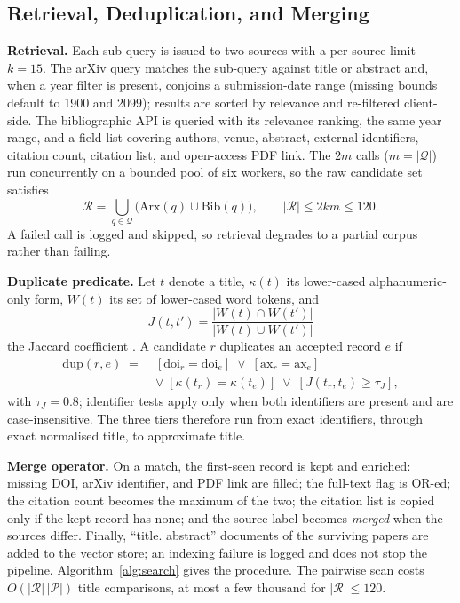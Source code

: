 \documentclass[conference]{IEEEtran}
\newcommand{\cP}{\mathcal{P}}
\newcommand{\cQ}{\mathcal{Q}}
\begin{document}
\subsection{Retrieval, Deduplication, and Merging}
\textbf{Retrieval.} Each sub-query is issued to two sources with a per-source limit $k=15$. The arXiv query matches the sub-query against title or abstract and, when a year filter is present, conjoins a submission-date range (missing bounds default to 1900 and 2099); results are sorted by relevance and re-filtered client-side. The bibliographic API is queried with its relevance ranking, the same year range, and a field list covering authors, venue, abstract, external identifiers, citation count, citation list, and open-access PDF link. The $2m$ calls ($m=|\cQ|$) run concurrently on a bounded pool of six workers, so the raw candidate set satisfies
\begin{equation}
\mathcal{R}=\bigcup_{q\in\cQ}\big(\mathrm{Arx}(q)\cup\mathrm{Bib}(q)\big),\qquad |\mathcal{R}|\le 2km\le 120 .
\label{eq:raw}
\end{equation}
A failed call is logged and skipped, so retrieval degrades to a partial corpus rather than failing.

\textbf{Duplicate predicate.} Let $t$ denote a title, $\kappa(t)$ its lower-cased alphanumeric-only form, $W(t)$ its set of lower-cased word tokens, and
\begin{equation}
J(t,t')=\frac{|W(t)\cap W(t')|}{|W(t)\cup W(t')|}
\label{eq:jaccard}
\end{equation}
the Jaccard coefficient \cite{jaccard1912}. A candidate $r$ duplicates an accepted record $e$ if
\begin{align}
\mathrm{dup}(r,e)\;=\;&[\mathrm{doi}_r=\mathrm{doi}_e]\;\lor\;[\mathrm{ax}_r=\mathrm{ax}_e]\nonumber\\
&\lor\;[\kappa(t_r)=\kappa(t_e)]\;\lor\;[J(t_r,t_e)\ge\tau_J],
\label{eq:dup}
\end{align}
with $\tau_J=0.8$; identifier tests apply only when both identifiers are present and are case-insensitive. The three tiers therefore run from exact identifiers, through exact normalised title, to approximate title.

\textbf{Merge operator.} On a match, the first-seen record is kept and enriched: missing DOI, arXiv identifier, and PDF link are filled; the full-text flag is OR-ed; the citation count becomes the maximum of the two; the citation list is copied only if the kept record has none; and the source label becomes \emph{merged} when the sources differ. Finally, ``title. abstract'' documents of the surviving papers are added to the vector store; an indexing failure is logged and does not stop the pipeline. Algorithm~\ref{alg:search} gives the procedure. The pairwise scan costs $O(|\mathcal{R}|\,|\cP|)$ title comparisons, at most a few thousand for $|\mathcal{R}|\le120$.
\end{document}
